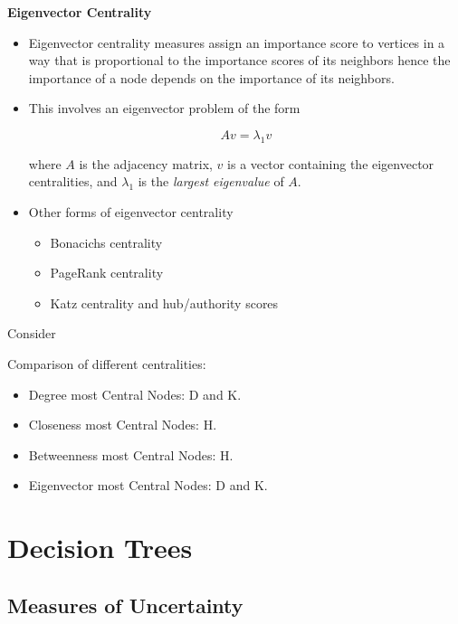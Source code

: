 \textbf{Eigenvector Centrality}
\begin{itemize}
    \item Eigenvector centrality measures assign an importance score to vertices in a way that is proportional to the importance scores of its neighbors hence the importance of a node depends on the importance of its neighbors.
    \item This involves an eigenvector problem of the form
          
          \begin{equation*}
              Av=\lambda _{1} v
          \end{equation*}
          
          where $A$ is the adjacency matrix, $v$ is a vector containing the eigenvector centralities, and $\lambda _{1}$ is the \textit{largest eigenvalue} of $A$.
    \item Other forms of eigenvector centrality
          \begin{itemize}
              \item Bonacichs centrality
              \item PageRank centrality
              \item Katz centrality and hub/authority scores
          \end{itemize}
\end{itemize}


Consider


Comparison of different centralities:
\begin{itemize}
    \item Degree most Central Nodes: D and K.
    \item Closeness most Central Nodes: H.
    \item Betweenness most Central Nodes: H.
    \item Eigenvector most Central Nodes: D and K.
\end{itemize}

\section{Decision Trees}

\subsection{Measures of Uncertainty}

